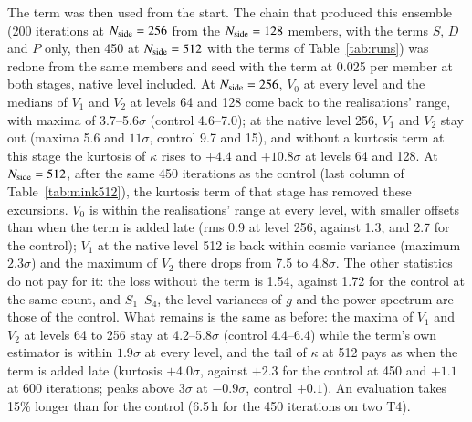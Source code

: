 \documentclass{aa}
\newcommand{\nside}{N_{\rm side}}
\begin{document}
The term was then used from the start. The chain that produced this ensemble (200 iterations at $\nside=256$ from the $\nside=128$ members, with the terms $S$, $D$ and $P$ only, then 450 at $\nside=512$ with the terms of Table~\ref{tab:runs}) was redone from the same members and seed with the term at 0.025 per member at both stages, native level included. At $\nside=256$, $V_0$ at every level and the medians of $V_1$ and $V_2$ at levels 64 and 128 come back to the realisations' range, with maxima of 3.7--5.6$\sigma$ (control 4.6--7.0); at the native level 256, $V_1$ and $V_2$ stay out (maxima 5.6 and $11\sigma$, control 9.7 and 15), and without a kurtosis term at this stage the kurtosis of $\kappa$ rises to $+4.4$ and $+10.8\sigma$ at levels 64 and 128. At $\nside=512$, after the same 450 iterations as the control (last column of Table~\ref{tab:mink512}), the kurtosis term of that stage has removed these excursions. $V_0$ is within the realisations' range at every level, with smaller offsets than when the term is added late (rms 0.9 at level 256, against 1.3, and 2.7 for the control); $V_1$ at the native level 512 is back within cosmic variance (maximum $2.3\sigma$) and the maximum of $V_2$ there drops from 7.5 to $4.8\sigma$. The other statistics do not pay for it: the loss without the term is 1.54, against 1.72 for the control at the same count, and $S_1$--$S_4$, the level variances of $g$ and the power spectrum are those of the control. What remains is the same as before: the maxima of $V_1$ and $V_2$ at levels 64 to 256 stay at 4.2--5.8$\sigma$ (control 4.4--6.4) while the term's own estimator is within $1.9\sigma$ at every level, and the tail of $\kappa$ at 512 pays as when the term is added late (kurtosis $+4.0\sigma$, against $+2.3$ for the control at 450 and $+1.1$ at 600 iterations; peaks above $3\sigma$ at $-0.9\sigma$, control $+0.1$). An evaluation takes 15\% longer than for the control (6.5\,h for the 450 iterations on two T4).
\end{document}
